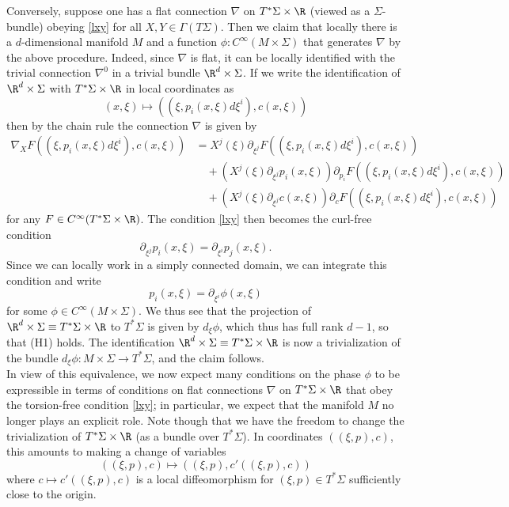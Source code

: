 \documentclass{article}
\numberwithin{equation}{section}
\theoremstyle{plain}
\begin{document}
Conversely, suppose one has a flat connection $\nabla$ on $T^* \Sigma \times \R$ (viewed as a $\Sigma$-bundle) obeying \eqref{lxy} for all $X,Y \in \Gamma(T\Sigma)$.  Then we claim that locally there is a $d$-dimensional manifold $M$ and a function $\phi: C^\infty(M \times \Sigma)$ that generates $\nabla$ by the above procedure.  Indeed, since $\nabla$ is flat, it can be locally identified with the trivial connection $\nabla^0$ in a trivial bundle $\R^d \times \Sigma$.  If we write the identification of $\R^d \times \Sigma$ with $T^* \Sigma \times \R$ in local coordinates as
$$(x,\xi) \mapsto ((\xi, p_i(x,\xi) d\xi^i), c(x,\xi))$$
then by the chain rule the connection $\nabla$ is given by
\begin{align*}
    \nabla_X F((\xi, p_i(x,\xi) d\xi^i), c(x,\xi)) &= X^j(\xi) \partial_{\xi^j} F((\xi, p_i(x,\xi) d\xi^i), c(x,\xi)) \\
&\quad + (X^j(\xi) \partial_{\xi^j} p_i(x,\xi)) \partial_{p_i} F((\xi, p_i(x,\xi) d\xi^i), c(x,\xi)) \\
&\quad + (X^j(\xi) \partial_{\xi^j} c(x,\xi)) \partial_c F((\xi, p_i(x,\xi) d\xi^i), c(x,\xi))
\end{align*}
for any $F \in C^\infty(T^* \Sigma \times \R)$.
The condition \eqref{lxy} then becomes the curl-free condition
$$ \partial_{\xi^j} p_i(x,\xi) = \partial_{\xi^i} p_j(x,\xi).$$
Since we can locally work in a simply connected domain, we can integrate this condition and write
$$ p_i(x,\xi) = \partial_{\xi^i} \phi(x,\xi)$$
for some $\phi \in C^\infty(M \times \Sigma)$.  We thus see that the projection of $\R^d \times \Sigma \equiv T^* \Sigma \times \R$ to $T^*\Sigma$ is given by $d_\xi \phi$, which thus has full rank $d-1$, so that (H1) holds.   The identification $\R^d \times \Sigma \equiv T^* \Sigma \times \R$ is now a trivialization of the bundle $d_\xi \phi: M \times \Sigma \to T^* \Sigma$, and the claim follows.\\

In view of this equivalence, we now expect many conditions on the phase $\phi$ to be expressible in terms of conditions on flat connections $\nabla$ on $T^* \Sigma \times \R$ that obey the torsion-free condition \eqref{lxy}; in particular, we expect that the manifold $M$ no longer plays an explicit role. Note though that we have the freedom to change the trivialization of $T^* \Sigma \times \R$ (as a bundle over $T^*\Sigma$).  In coordinates $((\xi,p),c)$, this amounts to making a change of variables
$$ ((\xi,p),c) \mapsto ((\xi,p),c'((\xi,p),c))$$
where $c \mapsto c'((\xi,p),c)$ is a local diffeomorphism for $(\xi,p) \in T^*\Sigma$ sufficiently close to the origin.\\
\end{document}
